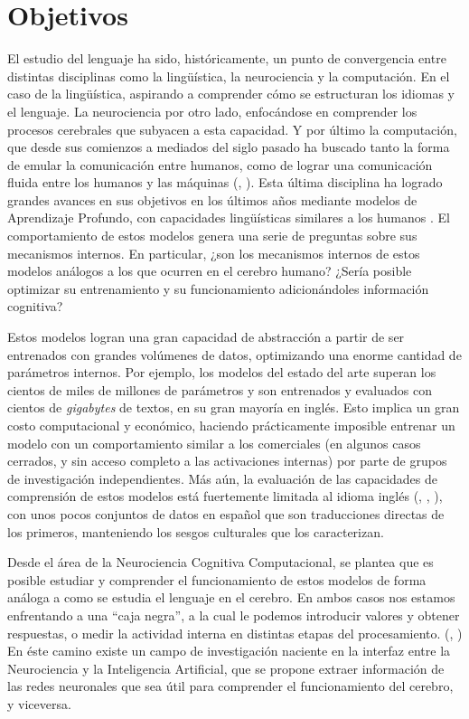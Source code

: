 \chapter{Objetivos}

El estudio del lenguaje ha sido, históricamente, un punto de convergencia entre distintas disciplinas como la lingüística, la neurociencia y la computación. En el caso de la lingüística, aspirando a comprender cómo se estructuran los idiomas y el lenguaje. La neurociencia por otro lado, enfocándose en comprender los procesos cerebrales que subyacen a esta capacidad. Y por último la computación, que desde sus comienzos a mediados del siglo pasado ha buscado tanto la forma de emular la comunicación entre humanos, como de lograr una comunicación fluida entre los humanos y las máquinas (\cite{Shannon1948}, \cite{Turing1950}). Esta última disciplina ha logrado grandes avances en sus objetivos en los últimos años mediante modelos de Aprendizaje Profundo, con capacidades lingüísticas similares a los humanos \parencite{ruder2018nlps}. El comportamiento de estos modelos genera una serie de preguntas sobre sus mecanismos internos. En particular, ¿son los mecanismos internos de estos modelos análogos a los que ocurren en el cerebro humano? ¿Sería posible optimizar su entrenamiento y su funcionamiento adicionándoles información cognitiva?

Estos modelos logran una gran capacidad de abstracción a partir de ser entrenados con grandes volúmenes de datos, optimizando una enorme cantidad de parámetros internos. Por ejemplo, los modelos del estado del arte superan los cientos de miles de millones de parámetros y son entrenados y evaluados con cientos de \textit{gigabytes} de textos, en su gran mayoría en inglés. \parencite{touvron2023llama2openfoundation} Esto implica un gran costo computacional y económico, haciendo prácticamente imposible entrenar un modelo con un comportamiento similar a los comerciales (en algunos casos cerrados, y sin acceso completo a las activaciones internas) por parte de grupos de investigación independientes. Más aún, la evaluación de las capacidades de comprensión de estos modelos está fuertemente limitada al idioma inglés (\cite{bisk2019piqareasoningphysicalcommonsense}, \cite{mihaylov2018suitarmorconductelectricity}, \cite{rajpurkar2018knowdontknowunanswerable}), con unos pocos conjuntos de datos en español que son traducciones directas de los primeros, manteniendo los sesgos culturales que los caracterizan.

Desde el área de la Neurociencia Cognitiva Computacional, se plantea que es posible estudiar y comprender el funcionamiento de estos modelos de forma análoga a como se estudia el lenguaje en el cerebro. En ambos casos nos estamos enfrentando a una “caja negra”, a la cual le podemos introducir valores y obtener respuestas, o medir la actividad interna en distintas etapas del procesamiento. (\cite{abnar2019blackboxmeetsblackboxrepresentational}, \cite{toneva2019}) En éste camino existe un campo de investigación naciente en la interfaz entre la Neurociencia y la Inteligencia Artificial, que se propone extraer información de las redes neuronales que sea útil para comprender el funcionamiento del cerebro, y viceversa.


